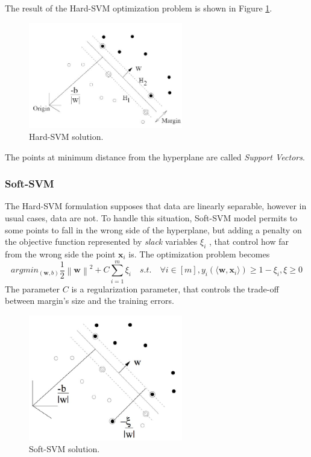 The result of the Hard-SVM optimization problem is shown in Figure \ref{fig:hard-svm}.

\begin{figure}[ht]
	\centering
	\includegraphics[width=0.6\textwidth]{figures/hard-svm.jpg}
	\caption{Hard-SVM solution.}
	\label{fig:hard-svm}
\end{figure}

The points at minimum distance from the hyperplane are called \textit{Support Vectors}.

\subsubsection{Soft-SVM}

The Hard-SVM formulation supposes that data are linearly separable, however in usual cases, data are not. To handle this situation, Soft-SVM model permits to some points to fall in the wrong side of the hyperplane, but adding a penalty on the objective function represented by \textit{slack} variables $\xi _i$ , that control how far from the wrong side the point $\mathbf{x}_i$ is. The optimization problem becomes
\[ argmin_{(\mathbf{w}, b)} \frac{1}{2} \left\lVert \mathbf{w} \right\rVert ^2 + C \sum_{i=1}^{m} \xi_i \quad s.t. \quad \forall i \in [m], y_i (\langle \mathbf{w}, \mathbf{x}_i \rangle) \ge 1 - \xi_i , \xi \ge 0  \]
The parameter $C$ is a regularization parameter, that controls the trade-off between margin's size and the training errors. 

\begin{figure}[ht]
	\centering
	\includegraphics[width=0.6\textwidth]{figures/soft-svm.jpg}
	\caption{Soft-SVM solution.}%
	\label{fig:soft-svm}
\end{figure}


